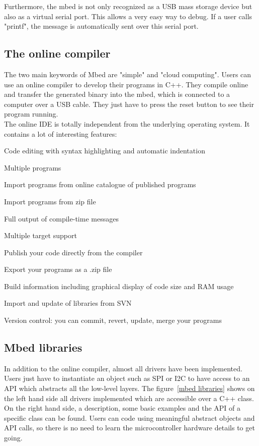 \documentclass[pdftex,10pt,a4paper]{report}
\newenvironment{packed_item}{
\begin{itemize}
  \setlength{\itemsep}{1pt}
  \setlength{\parskip}{0pt}
  \setlength{\parsep}{0pt}
}{\end{itemize}}
\begin{document}
Furthermore, the mbed is not only recognized as a USB mass storage device but also as a virtual serial port. This allows a very easy way to debug. If a user calls "printf", the message is automatically sent over this serial port.


\subsection{The online compiler}
The two main keywords of Mbed are "simple" and "cloud computing". Users can use an online compiler to develop their programs in C++. They compile online and transfer the generated binary into the mbed, which is connected to a computer over a USB cable. They just have to press the reset button to see their program running.
\\

The online IDE is totally independent from the underlying operating system. It contains a lot of interesting features:
\begin{packed_item}
	\item Code editing with syntax highlighting and automatic indentation
	\item Multiple programs
	\item Import programs from online catalogue of published programs
	\item Import programs from zip file
	\item Full output of compile-time messages
	\item Multiple target support
	\item Publish your code directly from the compiler
	\item Export your programs as a .zip file
	\item Build information including graphical display of code size and RAM usage
	\item Import and update of libraries from SVN
	\item Version control: you can commit, revert, update, merge your programs
\end{packed_item}

\subsection{Mbed libraries}
In addition to the online compiler, almost all drivers have been implemented. Users just have to instantiate an object such as SPI or I2C to have access to an API which abstracts all the low-level layers. The figure~\ref{mbed libraries} shows on the left hand side all drivers implemented which are accessible over a C++ class. On the right hand side, a description, some basic examples and the API of a specific class can be found. Users can code using meaningful abstract objects and API calls, so there is no need to learn the microcontroller hardware details to get going.\\
\end{document}
